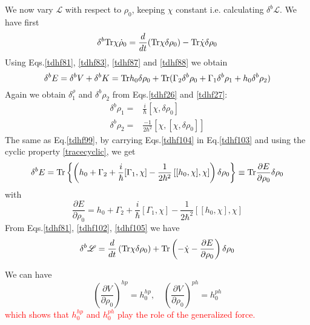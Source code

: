  We now vary $\mathscr{L}$ with respect to $\rho_0$, keeping $\chi$ constant i.e. calculating $\delta^b \mathscr{L}$. We have first 
  \begin{equation}
    \delta^b {\rm Tr} \chi\dot{\rho}_0 = \frac{d}{dt}({\rm Tr}\chi\delta\rho_0) - {\rm Tr}\dot{\chi}{\delta\rho_0}  \label{tdhf102}
  \end{equation}
  Using Eqs.\eqref{tdhf81}, \eqref{tdhf83}, \eqref{tdhf87} and \eqref{tdhf88} we obtain
  \begin{equation}
    \delta^b E = \delta^b V + \delta^b K = {\rm Tr}h_0\delta\rho_0 + {\rm Tr}(\Gamma_2\delta^b\rho_0 + \Gamma_1\delta^b\rho_1 + h_0\delta^b\rho_2)  \label{tdhf103}
  \end{equation}
  Again we obtain $\delta^\rho_1$ and $\delta^b\rho_2$ from Eqs.\eqref{tdhf26} and \eqref{tdhf27}:
  \begin{equation}
    \begin{aligned}
      \delta^b\rho_1 =& \frac{i}{\hbar}[\chi,\delta\rho_0]\\  \label{tdhf104}
      \delta^b\rho_2 =& \frac{-1}{2\hbar^2}[\chi,[\chi,\delta\rho_0]]
    \end{aligned}
  \end{equation}
  The same as Eq.\eqref{tdhf99}, by carrying Eqs.\eqref{tdhf104} in Eq.\eqref{tdhf103} and using the cyclic property \eqref{tracecyclic}, we get
  \begin{equation}
    \delta^b E = {\rm Tr}\left\{ \left(h_0 + \Gamma_2 + \frac{i}{\hbar}[\Gamma_1,\chi] - \frac{1}{2\hbar^2} \left[ [h_0,\chi], \chi \right]\right) \delta\rho_0 \right\} \equiv {\rm Tr}\frac{\partial E}{\partial \rho_0}\delta\rho_0  \label{tdhf105}
  \end{equation}
  with 
  \begin{equation}
    \frac{\partial E}{\partial \rho_0} = h_0 + \Gamma_2 + \frac{i}{\hbar}[\Gamma_1,\chi] - \frac{1}{2\hbar^2} \left[ [h_0,\chi], \chi \right]
  \end{equation}
  From Eqs.\eqref{tdhf81}, \eqref{tdhf102}, \eqref{tdhf105} we have
  \begin{equation}
    \delta^b \mathscr{L} = \frac{d}{dt}\left({\rm Tr}\chi\delta\rho_0\right) + {\rm Tr}\left( -\dot{\chi} - \frac{\partial E}{\partial\rho_0} \right)\delta\rho_0 \label{tdhf107}
  \end{equation}
  \begin{note}
    We can have
    \begin{equation}
      \left(\frac{\partial V}{\partial\rho_0}\right)^{hp} = h_0^{hp}, \quad \left(\frac{\partial V}{\partial\rho_0}\right)^{ph} = h_0^{ph}
    \end{equation}
    \textcolor{red}{which shows that $h_0^{hp}$ and $h_0^{ph}$ play the role of the generalized force.}
  \end{note}

